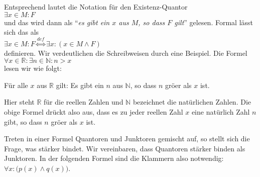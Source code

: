 \begin{enumerate}
      Entsprechend
      lautet die Notation f\"ur den Existenz-Quantor \\[0.2cm]
      \hspace*{1.3cm}  $\exists x \in M: F$ \\[0.2cm]
      und das wird dann  als ``\emph{es gibt ein $x$ aus $M$, so dass $F$ gilt}'' gelesen.  
      Formal l\"asst sich das als \\[0.2cm]
      \hspace*{1.3cm} $\exists x \in M: F \stackrel{de\!f}{\Longleftrightarrow} \exists x\colon (x\in M \wedge F)$ \\[0.2cm]
      definieren.       Wir verdeutlichen die Schreibweisen durch eine Beispiel.  Die Formel \\[0.2cm]
      \hspace*{1.3cm} $\forall x \in \mathbb{R}: \exists n \in \mathbb{N} : n > x$ \\[0.2cm]
      lesen wir wie folgt:
      \begin{center}
        {\em
        \begin{minipage}{12cm}
          F\"ur alle $x$ aus $\mathbb{R}$ gilt: Es gibt ein $n$ aus $\mathbb{N}$, so dass
          $n$ gr\"o\3er als $x$ ist.
        \end{minipage}
        }
      \end{center}
      Hier steht $\mathbb{R}$ f\"ur die reellen Zahlen und $\mathbb{N}$ bezeichnet die nat\"urlichen Zahlen.
      Die obige Formel dr\"uckt also aus, dass es zu jeder reellen Zahl $x$ eine nat\"urlich Zahl $n$ gibt, 
      so dass $n$ gr\"o\3er als $x$ ist.

      Treten in einer Formel Quantoren und Junktoren gemischt auf, so stellt sich die
      Frage, was st\"arker bindet.  Wir vereinbaren, dass Quantoren st\"arker binden als
      Junktoren.  In der folgenden Formel sind die Klammern also notwendig: \\[0.2cm]
      \hspace*{1.3cm} 
      $\forall x \colon \bigl(p(x) \wedge q(x)\bigr)$. 
\end{enumerate}

